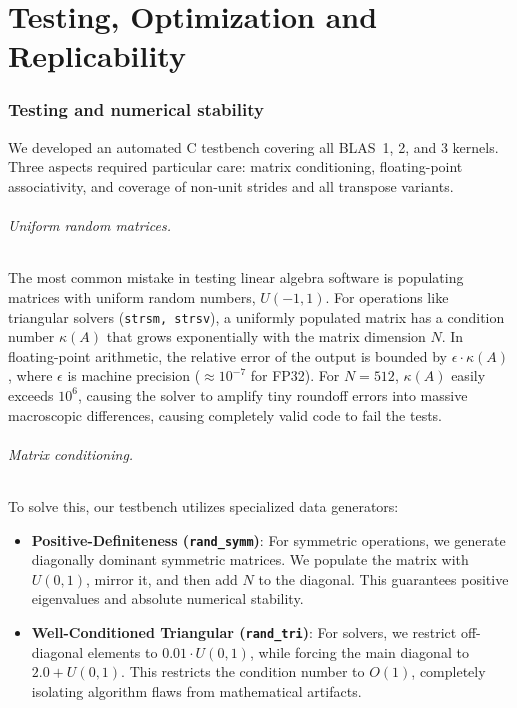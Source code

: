 \documentclass[11pt,a4paper]{article}
\begin{document}
\newpage
\part{Testing, Optimization and Replicability}

\section{Testing and numerical stability}

We developed an automated C testbench covering all BLAS~1, 2, and 3 kernels. Three aspects required particular care: matrix conditioning, floating-point associativity, and coverage of non-unit strides and all transpose variants.

\paragraph{Uniform random matrices.}
The most common mistake in testing linear algebra software is populating matrices with uniform random numbers, $U(-1, 1)$. For operations like triangular solvers (\texttt{strsm, strsv}), a uniformly populated matrix has a condition number $\kappa(A)$ that grows exponentially with the matrix dimension $N$. 
In floating-point arithmetic, the relative error of the output is bounded by $\epsilon \cdot \kappa(A)$, where $\epsilon$ is machine precision ($\approx 10^{-7}$ for FP32). For $N=512$, $\kappa(A)$ easily exceeds $10^6$, causing the solver to amplify tiny roundoff errors into massive macroscopic differences, causing completely valid code to fail the tests.

\paragraph{Matrix conditioning.}
To solve this, our testbench utilizes specialized data generators:
\begin{itemize}
    \item \textbf{Positive-Definiteness (\texttt{rand\_symm})}: For symmetric operations, we generate diagonally dominant symmetric matrices. We populate the matrix with $U(0,1)$, mirror it, and then add $N$ to the diagonal. This guarantees positive eigenvalues and absolute numerical stability.
    \item \textbf{Well-Conditioned Triangular (\texttt{rand\_tri})}: For solvers, we restrict off-diagonal elements to $0.01 \cdot U(0,1)$, while forcing the main diagonal to $2.0 + U(0,1)$. This restricts the condition number to $O(1)$, completely isolating algorithm flaws from mathematical artifacts.
\end{itemize}
\end{document}
